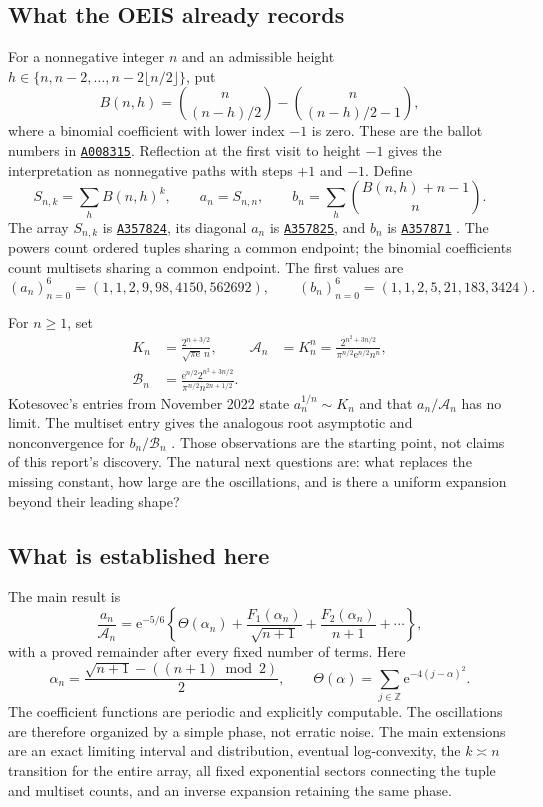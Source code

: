 \documentclass[11pt,a4paper]{article}
\numberwithin{equation}{section}
\theoremstyle{definition}
\newcommand{\Z}{\mathbb Z}
\newcommand{\Acal}{\mathcal A}
\newcommand{\Bcal}{\mathcal B}
\newcommand{\ee}{\mathrm e}
\newcommand{\seq}[1]{\href{https://oeis.org/#1}{\texttt{#1}}}
\begin{document}
\subsection{What the OEIS already records}
For a nonnegative integer $n$ and an admissible height
$h\in\{n,n-2,\ldots,n-2\lfloor n/2\rfloor\}$, put
\begin{equation}\label{tbs:eq:ballot}
 B(n,h)=\binom{n}{(n-h)/2}-\binom{n}{(n-h)/2-1},
\end{equation}
where a binomial coefficient with lower index $-1$ is zero. These are the
ballot numbers in \seq{A008315}. Reflection at the first visit to height
$-1$ gives the interpretation as nonnegative paths with steps $+1$ and
$-1$. Define
\begin{equation}\label{tbs:eq:definitions}
 S_{n,k}=\sum_h B(n,h)^k,\qquad
 a_n=S_{n,n},\qquad
 b_n=\sum_h\binom{B(n,h)+n-1}{n}.
\end{equation}
The array $S_{n,k}$ is \seq{A357824}, its diagonal $a_n$ is
\seq{A357825}, and $b_n$ is \seq{A357871}
\cite{oeisballot,oeisarray,oeisa,oeisb}. The powers count ordered tuples
sharing a common endpoint; the binomial coefficients count multisets
sharing a common endpoint. The first values are
\[
 (a_n)_{n=0}^6=(1,1,2,9,98,4150,562692),\qquad
 (b_n)_{n=0}^6=(1,1,2,5,21,183,3424).
\]

For $n\ge1$, set
\begin{align}
 K_n&=\frac{2^{n+3/2}}{\sqrt{\pi\ee}\,n},&
 \Acal_n&=K_n^n
 =\frac{2^{n^2+3n/2}}{\pi^{n/2}\ee^{n/2}n^n},\label{tbs:eq:normalizations-a}\\
 \Bcal_n&=\frac{\ee^{n/2}2^{n^2+3n/2}}
 {\pi^{n/2}n^{2n+1/2}}.\label{tbs:eq:normalizations-b}
\end{align}
Kotesovec's entries from November 2022 state $a_n^{1/n}\sim K_n$ and
that $a_n/\Acal_n$ has no limit. The multiset entry gives the analogous
root asymptotic and nonconvergence for $b_n/\Bcal_n$
\cite{oeisa,oeisb}. Those observations are the starting point, not claims
of this report's discovery. The natural next questions are: what replaces
the missing constant, how large are the oscillations, and is there a
uniform expansion beyond their leading shape?

\subsection{What is established here}
The main result is
\begin{equation}\label{tbs:eq:main-preview}
 \frac{a_n}{\Acal_n}
 =\ee^{-5/6}\!\left\{\Theta(\alpha_n)
 +\frac{F_1(\alpha_n)}{\sqrt{n+1}}
 +\frac{F_2(\alpha_n)}{n+1}+\cdots\right\},
\end{equation}
with a proved remainder after every fixed number of terms. Here
\[
 \alpha_n=\frac{\sqrt{n+1}-((n+1)\bmod2)}2,
 \qquad
 \Theta(\alpha)=\sum_{j\in\Z}\ee^{-4(j-\alpha)^2}.
\]
The coefficient functions are periodic and explicitly computable. The
oscillations are therefore organized by a simple phase, not erratic noise.
The main extensions are an exact limiting interval and distribution,
eventual log-convexity, the $k\asymp n$ transition for the entire array,
all fixed exponential sectors connecting the tuple and multiset counts,
and an inverse expansion retaining the same phase.
\end{document}
